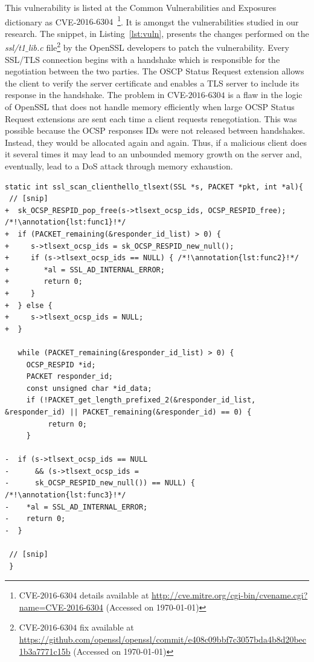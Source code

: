 \documentclass[10pt,conference]{IEEEtran}
\newcounter{lstannotation}
\renewcommand{\thelstannotation}{\ding{\number\numexpr181+\arabic{lstannotation}}}
\newcommand{\annotation}[1]{\refstepcounter{lstannotation}\label{#1}\thelstannotation}
\begin{document}
This vulnerability is listed at the Common
Vulnerabilities and Exposures dictionary as CVE-$2016$-$6304$~\footnote{CVE-$2016$-$6304$
details available at \url{http://cve.mitre.org/cgi-bin/cvename.cgi?name=CVE-2016-6304}
(Accessed on \today{})}. It is amongst the vulnerabilities studied in our
research. The snippet, in Listing~\ref{lst:vuln}, presents the changes performed on the
\emph{ssl/t1$\_$lib.c} file\footnote{CVE-$2016$-$6304$ fix available  at
\url{https://github.com/openssl/openssl/commit/e408c09bbf7c3057bda4b8d20bec1b3a7771c15b}
(Accessed on \today{})} by the OpenSSL developers to patch the vulnerability. 
Every SSL/TLS connection begins with a handshake 
which is responsible for the negotiation between the two parties. 
The OSCP Status Request extension allows the client to verify
the server certificate and enables a TLS server to include
its response in the handshake. The problem in CVE-$2016$-$6304$
is a flaw in the logic of OpenSSL that does not handle memory efficiently
when large OCSP Status Request extensions are sent each time a client 
requests renegotiation. This was possible because the OCSP responses IDs 
were not released between handshakes. Instead, they would be allocated 
again and again. Thus, if a malicious client does it several times it may lead to 
an unbounded memory growth on the server and, eventually, lead to a 
DoS attack through memory exhaustion. 



\medskip
\setcounter{lstannotation}{0}
\begin{lstlisting}[style={CStyle}, caption={Patch provided by OpenSSL developers to the
\\CVE-2016-6304 vulnerability on file ssl/t1\_lib.c},label={lst:vuln}]
static int ssl_scan_clienthello_tlsext(SSL *s, PACKET *pkt, int *al){ 
 // [snip]
+  sk_OCSP_RESPID_pop_free(s->tlsext_ocsp_ids, OCSP_RESPID_free); /*!\annotation{lst:func1}!*/
+  if (PACKET_remaining(&responder_id_list) > 0) { 
+     s->tlsext_ocsp_ids = sk_OCSP_RESPID_new_null();
+     if (s->tlsext_ocsp_ids == NULL) { /*!\annotation{lst:func2}!*/
+        *al = SSL_AD_INTERNAL_ERROR;
+        return 0;
+     }
+  } else {
+     s->tlsext_ocsp_ids = NULL;
+  }

   while (PACKET_remaining(&responder_id_list) > 0) {
     OCSP_RESPID *id;
     PACKET responder_id;
     const unsigned char *id_data;
     if (!PACKET_get_length_prefixed_2(&responder_id_list, &responder_id) || PACKET_remaining(&responder_id) == 0) {
          return 0;
     }

-  if (s->tlsext_ocsp_ids == NULL 
-      && (s->tlsext_ocsp_ids = 
-      sk_OCSP_RESPID_new_null()) == NULL) { /*!\annotation{lst:func3}!*/
-    *al = SSL_AD_INTERNAL_ERROR;
-    return 0;
-  }

 // [snip]
 }
\end{lstlisting}
\end{document}
